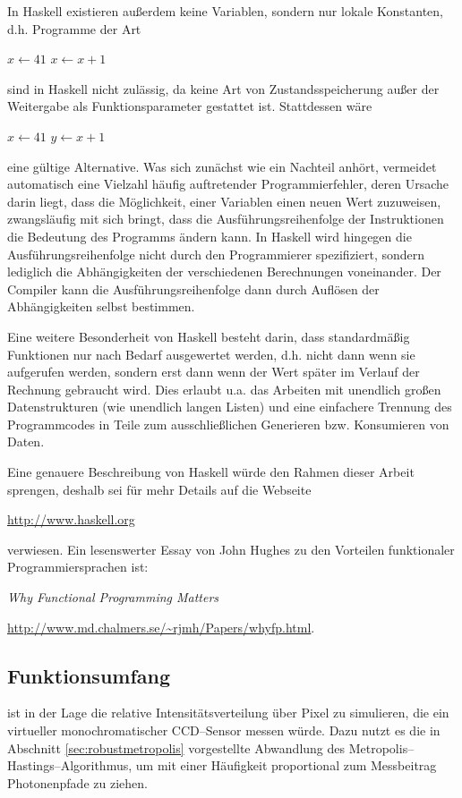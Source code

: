 	In Haskell existieren außerdem keine Variablen, sondern nur lokale Konstanten, d.h. Programme der Art
		\begin{algorithmic}
			\STATE $x\leftarrow 41$
			\STATE $x\leftarrow x+1$
		\end{algorithmic}
	sind in Haskell nicht zulässig, da keine Art von Zustandsspeicherung außer der Weitergabe als Funktionsparameter gestattet ist. Stattdessen wäre
		\begin{algorithmic}
			\STATE $x\leftarrow 41$
			\STATE $y\leftarrow x+1$
		\end{algorithmic}
	eine gültige Alternative. Was sich zunächst wie ein Nachteil anhört, vermeidet automatisch eine Vielzahl häufig auftretender Programmierfehler, deren Ursache darin liegt, dass die Möglichkeit, einer Variablen einen neuen Wert zuzuweisen, zwangsläufig mit sich bringt, dass die Ausführungsreihenfolge der Instruktionen die Bedeutung des Programms ändern kann. In Haskell wird hingegen die Ausführungsreihenfolge nicht durch den Programmierer spezifiziert, sondern lediglich die Abhängigkeiten der verschiedenen Berechnungen voneinander. Der Compiler kann die Aus\-führ\-ungs\-rei\-hen\-fol\-ge dann durch Auflösen der Abhängigkeiten selbst bestimmen.
	
	Eine weitere Besonderheit von Haskell besteht darin, dass standardmäßig Funktionen nur nach Bedarf ausgewertet werden, d.h. nicht dann wenn sie aufgerufen werden, sondern erst dann wenn der Wert später im Verlauf der Rechnung gebraucht wird. Dies erlaubt u.a. das Arbeiten mit unendlich großen Datenstrukturen (wie unendlich langen Listen) und eine einfachere Trennung des  Programmcodes in Teile zum ausschließlichen Generieren bzw. Konsumieren von Daten.
		
	Eine genauere Beschreibung von Haskell würde den Rahmen dieser Arbeit sprengen, deshalb sei für mehr Details auf die Webseite
	
	\url{http://www.haskell.org}
	
	verwiesen. Ein lesenswerter Essay von John Hughes zu den Vorteilen funktionaler Programmiersprachen ist:
	
	{\em Why Functional Programming Matters}
	
	\url{http://www.md.chalmers.se/~rjmh/Papers/whyfp.html}.
	
	
	\subsection{Funktionsumfang}
	\pirate ist in der Lage die relative Intensitätsverteilung über Pixel zu simulieren, die ein virtueller monochromatischer CCD--Sensor messen würde. Dazu nutzt es die in Abschnitt \ref{sec:robustmetropolis} vorgestellte Abwandlung des Metropolis--Hastings--Algorithmus, um mit einer Häufigkeit proportional zum Messbeitrag Photonenpfade zu ziehen.
	
